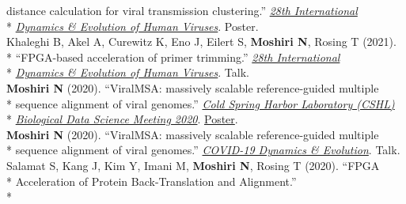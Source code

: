 \documentclass[margin,line]{res}
\begin{document}
\begin{resume}
\hspace*{9.5mm} distance calculation for viral transmission clustering.'' \href{https://cpd.ucsd.edu/hivdynamics/}{\textit{28th International}}\\*\vspace{2mm}
\hspace*{8mm} \href{https://cpd.ucsd.edu/hivdynamics/}{\textit{Dynamics \& Evolution of Human Viruses}}. Poster.\\
\hspace*{4mm} Khaleghi B, Akel A, Curewitz K, Eno J, Eilert S, \textbf{Moshiri N}, Rosing T (2021).\\*
\hspace*{9.5mm} ``FPGA-based acceleration of primer trimming.'' \href{https://cpd.ucsd.edu/hivdynamics/}{\textit{28th International}}\\*\vspace{2mm}
\hspace*{8mm} \href{https://cpd.ucsd.edu/hivdynamics/}{\textit{Dynamics \& Evolution of Human Viruses}}. Talk.\\
\hspace*{4mm} \textbf{Moshiri N} (2020). ``ViralMSA: massively scalable reference-guided multiple\\*
\hspace*{9.5mm} sequence alignment of viral genomes.'' \href{http://meetings.cshl.edu/meetings.aspx?meet=DATA&year=20}{\textit{Cold Spring Harbor Laboratory (CSHL)}}\\*\vspace{2mm}
\hspace*{8mm} \href{http://meetings.cshl.edu/meetings.aspx?meet=DATA&year=18}{\textit{Biological Data Science Meeting 2020}}. \href{https://meetings.cshl.edu/posters/data20/data2020_AbstractBookVirtual.pdf}{Poster}.\\
\hspace*{4mm} \textbf{Moshiri N} (2020). ``ViralMSA: massively scalable reference-guided multiple\\*\vspace{2mm}
\hspace*{8mm} sequence alignment of viral genomes.'' \href{https://cpd.ucsd.edu/covid19/}{\textit{COVID-19 Dynamics \& Evolution}}. Talk.\\
\hspace*{4mm} Salamat S, Kang J, Kim Y, Imani M, \textbf{Moshiri N}, Rosing T (2020). ``FPGA\\*
\hspace*{9.5mm} Acceleration of Protein Back-Translation and Alignment.''\\*\vspace{2mm}

\end{resume}
\end{document}
